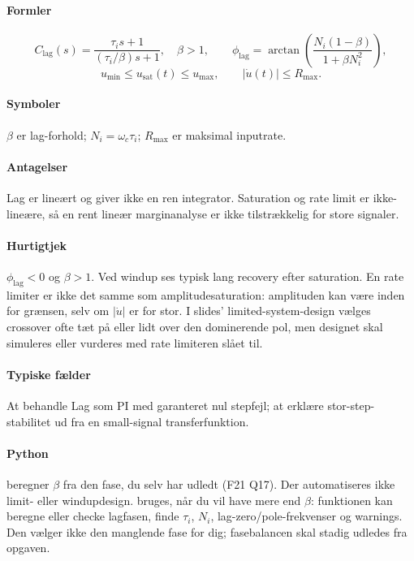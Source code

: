 \paragraph{Formler}
\begin{equation}
\label{eq:lag-controller-phase}
C_{\mathrm{lag}}(s)=\frac{\tau_i s+1}{(\tau_i/\beta)s+1},\quad \beta>1,\qquad
\phi_{\mathrm{lag}}=\arctan\!\left(\frac{N_i(1-\beta)}{1+\beta N_i^2}\right),
\end{equation}
\begin{equation}
\label{eq:actuator-limits}
u_{\min}\leq u_{\mathrm{sat}}(t)\leq u_{\max},\qquad |\dot u(t)|\leq R_{\max}.
\end{equation}

\paragraph{Symboler}
\(\beta\) er lag-forhold; \(N_i=\omega_c\tau_i\); \(R_{\max}\) er maksimal inputrate.

\paragraph{Antagelser}
Lag er lineært og giver ikke en ren integrator. Saturation og rate limit er
ikke-lineære, så en rent lineær marginanalyse er ikke tilstrækkelig for store signaler.

\paragraph{Hurtigtjek}
\(\phi_{\mathrm{lag}}<0\) og \(\beta>1\). Ved windup ses typisk lang recovery efter saturation.
En rate limiter er ikke det samme som amplitudesaturation: amplituden kan være inden for
grænsen, selv om \(|\dot u|\) er for stor. I slides' limited-system-design vælges
crossover ofte tæt på eller lidt over den dominerende pol, men designet skal simuleres
eller vurderes med rate limiteren slået til.

\paragraph{Typiske fælder}
At behandle Lag som PI med garanteret nul stepfejl; at erklære stor-step-stabilitet
ud fra en small-signal transferfunktion.

\paragraph{Python}
 beregner \(\beta\) fra den fase,
du selv har udledt (F21 Q17). Der automatiseres ikke limit- eller windupdesign.
 bruges, når du vil have
mere end \(\beta\): funktionen kan beregne eller checke lagfasen, finde \(\tau_i\),
\(N_i\), lag-zero/pole-frekvenser og warnings. Den vælger ikke den manglende fase for
dig; fasebalancen skal stadig udledes fra opgaven.

